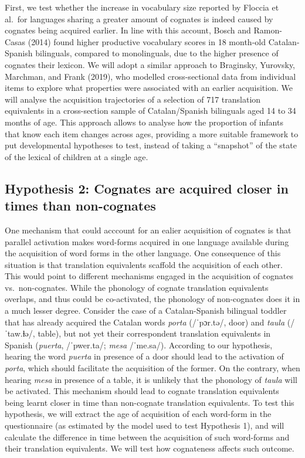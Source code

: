 \documentclass[english,man,man,floatsintext]{apa6}
\begin{document}
First, we test whether the increase in vocabulary size reported by Floccia et al.~for languages sharing a greater amount of cognates is indeed caused by cognates being acquired earlier. In line with this account, Bosch and Ramon-Casas (2014) found higher productive vocabulary scores in 18 month-old Catalan-Spanish bilinguals, compared to monolinguals, due to the higher presence of cognates their lexicon. We will adopt a similar approach to Braginsky, Yurovsky, Marchman, and Frank (2019), who modelled cross-sectional data from individual items to explore what properties were associated with an earlier acquisition. We will analyse the acquisition trajectories of a selection of 717 translation equivalents in a cross-section sample of Catalan/Spanish bilinguals aged 14 to 34 months of age. This approach allows to analyse how the proportion of infants that know each item changes across ages, providing a more suitable framework to put developmental hypotheses to test, instead of taking a \enquote{snapshot} of the state of the lexical of children at a single age.

\hypertarget{hypothesis-2-cognates-are-acquired-closer-in-times-than-non-cognates}{%
\subsection{Hypothesis 2: Cognates are acquired closer in times than non-cognates}\label{hypothesis-2-cognates-are-acquired-closer-in-times-than-non-cognates}}

One mechanism that could acccount for an ealier acquisition of cognates is that parallel activation makes word-forms acquired in one language available during the acquisition of word forms in the other language. One consequence of this situation is that translation equivalents scaffold the acquisition of each other. This would point to different mechanisms engaged in the acquisition of cognates vs.~non-cognates. While the phonology of cognate translation equivalents overlaps, and thus could be co-activated, the phonology of non-cognates does it in a much lesser degree. Consider the case of a Catalan-Spanish bilingual toddler that has already acquired the Catalan words \emph{porta} (/ˈpɔr.tə/, door) and \emph{taula} (/ˈtaw.ɫə/, table), but not yet their correspondent translation equivalents in Spanish (\emph{puerta}, /ˈpwer.ta/; \emph{mesa} /ˈme.sa/). According to our hypothesis, hearing the word \emph{puerta} in presence of a door should lead to the activation of \emph{porta}, which should facilitate the acquisition of the former. On the contrary, when hearing \emph{mesa} in presence of a table, it is unlikely that the phonology of \emph{taula} will be activated. This mechanism should lead to cognate translation equivalents being learnt closer in time than non-cognate translation equivalents. To test this hypothesis, we will extract the age of acquisition of each word-form in the questionnaire (as estimated by the model used to test Hypothesis 1), and will calculate the difference in time between the acquisition of such word-forms and their translation equivalents. We will test how cognateness affects such outcome.
\end{document}

